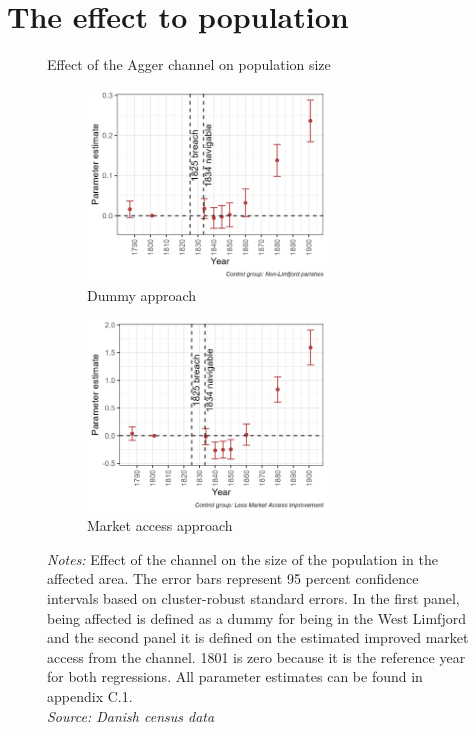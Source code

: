 \documentclass[11pt]{article}
\begin{document}
\FloatBarrier
\section{The effect to population}

\begin{figure}
    \centering
    \caption{Effect of the Agger channel on population size}
    \begin{subfigure}[b]{0.8\textwidth}
        \centering
        \caption{Dummy approach}
        \includegraphics[width=0.7\textwidth]{Plots/Regression_plots/pop_dummy.png}
    \end{subfigure}
    \vspace{1cm}
    \begin{subfigure}[b]{0.8\textwidth}
        \centering
        \caption{Market access approach}
        \includegraphics[width=0.7\textwidth]{Plots/Regression_plots/pop_MA.png}
    \end{subfigure}
    \parbox{1\textwidth}{
    \caption*{\footnotesize \textit{Notes:} Effect of the channel on the size of the population in the affected area. The error bars represent 95 percent confidence intervals based on cluster-robust standard errors. In the first panel, being affected is defined as a dummy for being in the West Limfjord and the second panel it is defined on the estimated improved market access from the channel. 1801 is zero because it is the reference year for both regressions. All parameter estimates can be found in appendix C.1. \\ \textit{Source: Danish census data}}
} \label{fig:pop1}
\end{figure}
\end{document}
